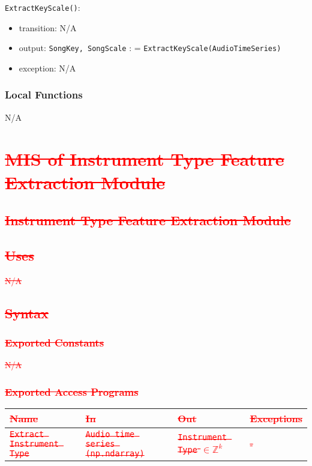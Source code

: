\documentclass[12pt, titlepage]{article}
\begin{document}
\noindent \texttt{ExtractKeyScale()}:
\begin{itemize}
\item transition: N/A
\item output: \texttt{Song\textunderscore Key, Song\textunderscore Scale} : = \texttt{ExtractKeyScale(Audio\textunderscore Time\textunderscore Series)}
\item exception: N/A
\end{itemize}

\subsubsection{Local Functions}
N/A


\section{\textcolor{red}{\sout{MIS of Instrument Type Feature Extraction Module}}} 

\subsection{\textcolor{red}{\sout{Instrument Type Feature Extraction Module}}}

\subsection{\textcolor{red}{\sout{Uses}}}
\textcolor{red}{\sout{N/A}}

\subsection{\textcolor{red}{\sout{Syntax}}}

\subsubsection{\textcolor{red}{\sout{Exported Constants}}}
\textcolor{red}{\sout{N/A}}

\subsubsection{\textcolor{red}{\sout{Exported Access Programs}}}

\begin{center}
\begin{tabular}{p{2cm} p{4cm} p{4cm} p{2cm}}
\hline
\textcolor{red}{\sout{\textbf{Name}}} & \textcolor{red}{\sout{\textbf{In}}} & \textcolor{red}{\sout{\textbf{Out}}} & \textcolor{red}{\sout{\textbf{Exceptions}}}\\
\hline
\textcolor{red}{\sout{\texttt{Extract Instrument Type}}} & \textcolor{red}{\sout{\texttt{Audio time series (np.ndarray)}}} & \textcolor{red}{\sout{\texttt{Instrument Type} $\in \mathbb{Z}^k$}} & \textcolor{red}{\sout{-}}\\
\hline
\end{tabular}
\end{center}
\end{document}
